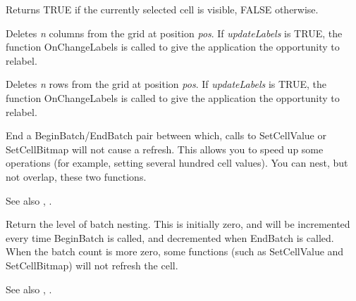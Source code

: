 \label{wxgridcurrentcellvisible}


Returns TRUE if the currently selected cell is visible, FALSE otherwise.

\label{wxgriddeletecols}


Deletes {\it n} columns from the grid at position {\it pos}. If {\it updateLabels} is TRUE,
the function OnChangeLabels is called to give the application the opportunity to relabel.

\label{wxgriddeleterows}


Deletes {\it n} rows from the grid at position {\it pos}. If {\it updateLabels} is TRUE,
the function OnChangeLabels is called to give the application the opportunity to relabel.

\label{wxgridendbatch}


End a BeginBatch/EndBatch pair between which, calls to SetCellValue or
SetCellBitmap will not cause a refresh. This allows you to speed up some operations
(for example, setting several hundred cell values). You can nest, but not overlap,
these two functions.

See also , .

\label{wxgridgetbatchcount}


Return the level of batch nesting. This is initially zero, and will be incremented
every time BeginBatch is called, and decremented when EndBatch is called. When the
batch count is more zero, some functions (such as SetCellValue and SetCellBitmap) will
not refresh the cell.

See also , .

\label{wxgridgetcell}


